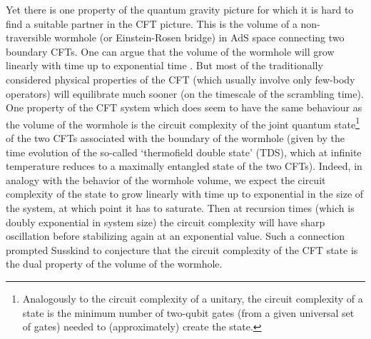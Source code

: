 \documentclass[11pt,letterpaper]{article}
\newcommand{\<}{\langle}
\renewcommand{\>}{\rangle}
\begin{document}
Yet there is one property of the quantum gravity picture for which it is hard to find a suitable partner in the CFT picture. This is the volume of a non-traversible wormhole (or Einstein-Rosen bridge) in AdS space connecting two boundary CFTs. One can argue that the volume of the wormhole will grow linearly with time up to exponential time \cite{LS}. But most  of the traditionally considered physical properties of the CFT (which usually involve only few-body operators) will equilibrate much sooner (on the timescale of the scrambling time). One property of the CFT system which does seem to have the same behaviour as the volume of the wormhole is the circuit complexity of the joint quantum state\footnote{Analogously to the circuit complexity of a unitary, the circuit complexity of a state is the minimum number of two-qubit gates (from a given universal set of gates) needed to (approximately) create the state.} of the two CFTs associated with the boundary of the wormhole (given by the time evolution of the so-called `thermofield double state' (TDS), which at infinite temperature reduces to a maximally entangled state of the two CFTs). Indeed, in analogy with the behavior of the wormhole volume, we expect the circuit complexity of the state to grow linearly with time up to exponential in the size of the system, at which point it has to saturate. Then at recursion times (which is doubly exponential in system size) the circuit complexity will have sharp oscillation before stabilizing again at an exponential value. Such a connection prompted Susskind to conjecture that the circuit complexity of the CFT state is the dual property of the volume of the wormhole.
\end{document}
